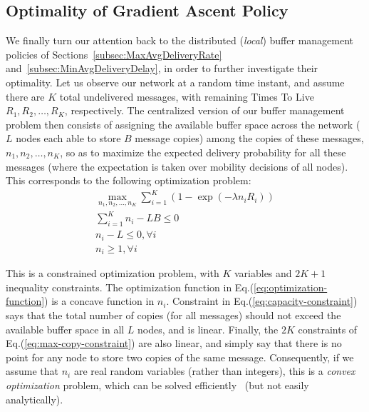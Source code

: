 \subsection{Optimality of Gradient Ascent Policy}
\label{OptimalityOfGradientPolicy}
We finally turn our attention back to the distributed (\emph{local}) buffer management policies of Sections~\ref{subsec:MaxAvgDeliveryRate} and~\ref{subsec:MinAvgDeliveryDelay}, in order to further investigate their optimality. Let us observe our network at a random time instant, and assume there are $K$ total undelivered messages, with remaining Times To Live $R_{1}, R_{2}, \dots, R_{K}$, respectively. The centralized version of our buffer management problem then consists of assigning the available buffer space across the network ($L$ nodes each able to store $B$ message copies) among the copies of these messages, $n_{1}, n_{2}, \dots, n_{K}$, so as to maximize the expected delivery probability for all these messages (where the expectation is taken over mobility decisions of all nodes). This corresponds to the following optimization problem:
\begin{eqnarray}
\underset{n_{1},n_{2},\dots,n_{K}}{\max} \sum_{i=1}^{K} (1-\exp(-\lambda n_i R_i)) \label{eq:optimization-function} \\
\sum_{i=1}^{K} n_{i} - L B \le 0 \label{eq:capacity-constraint} \\
n_{i} - L  \le 0, \forall i \label{eq:max-copy-constraint} \\
n_{i} \geq 1, \forall i \label{eq:min-copy-constraint}
\end{eqnarray}

This is a constrained optimization problem, with $K$ variables and $2K+1$ inequality constraints. The optimization function in Eq.(\ref{eq:optimization-function}) is a concave function in $n_{i}$. Constraint in Eq.(\ref{eq:capacity-constraint}) says that the total number of copies (for all messages) should not exceed the available buffer space in all $L$ nodes, and is linear. Finally, the $2K$ constraints of Eq.(\ref{eq:max-copy-constraint}) are also linear, and simply say that there is no point for any node to store two copies of the same message. Consequently, if we assume that $n_{i}$ are real random variables (rather than integers), this is a \emph{convex optimization} problem, which can be solved efficiently~\cite{Boyd:convex-optimization-book} (but not easily analytically).


